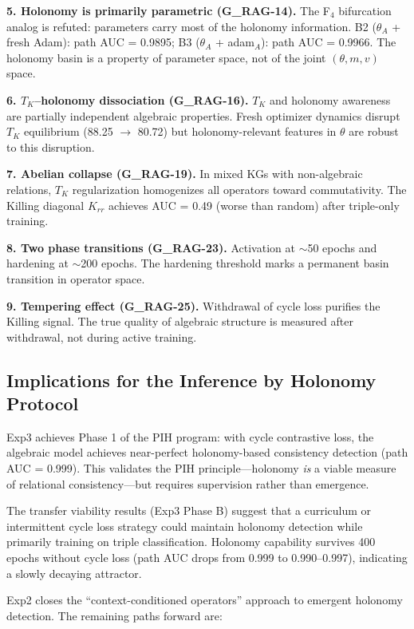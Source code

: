 \documentclass[11pt,letterpaper]{article}
\begin{document}
\textbf{5. Holonomy is primarily parametric (G\_RAG-14).} The F$_4$ bifurcation analog is refuted: parameters carry most of the holonomy information. B2 ($\theta_A$ + fresh Adam): path AUC = 0.9895; B3 ($\theta_A$ + adam$_A$): path AUC = 0.9966. The holonomy basin is a property of parameter space, not of the joint $(\theta, m, v)$ space.

\textbf{6. $T_K$--holonomy dissociation (G\_RAG-16).} $T_K$ and holonomy awareness are partially independent algebraic properties. Fresh optimizer dynamics disrupt $T_K$ equilibrium (88.25 $\to$ 80.72) but holonomy-relevant features in $\theta$ are robust to this disruption.

\textbf{7. Abelian collapse (G\_RAG-19).} In mixed KGs with non-algebraic relations, $T_K$ regularization homogenizes all operators toward commutativity. The Killing diagonal $K_{rr}$ achieves AUC = 0.49 (worse than random) after triple-only training.

\textbf{8. Two phase transitions (G\_RAG-23).} Activation at $\sim$50 epochs and hardening at $\sim$200 epochs. The hardening threshold marks a permanent basin transition in operator space.

\textbf{9. Tempering effect (G\_RAG-25).} Withdrawal of cycle loss purifies the Killing signal. The true quality of algebraic structure is measured after withdrawal, not during active training.

\subsection{Implications for the Inference by Holonomy Protocol}

Exp3 achieves Phase 1 of the PIH program: with cycle contrastive loss, the algebraic model achieves near-perfect holonomy-based consistency detection (path AUC = 0.999). This validates the PIH principle---holonomy \textit{is} a viable measure of relational consistency---but requires supervision rather than emergence.

The transfer viability results (Exp3 Phase B) suggest that a curriculum or intermittent cycle loss strategy could maintain holonomy detection while primarily training on triple classification. Holonomy capability survives 400 epochs without cycle loss (path AUC drops from 0.999 to 0.990--0.997), indicating a slowly decaying attractor.

Exp2 closes the ``context-conditioned operators'' approach to emergent holonomy detection. The remaining paths forward are:
\end{document}
